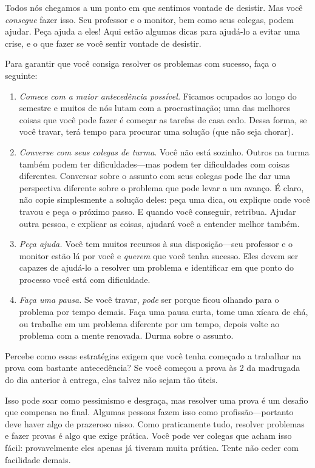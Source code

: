 \documentclass[../../../include/open-logic-section]{subfiles}
\begin{document}


Todos nós chegamos a um ponto em que sentimos vontade de desistir. Mas
você \emph{consegue} fazer isso. Seu professor e o monitor, bem como
seus colegas, podem ajudar. Peça ajuda a eles!{}  Aqui estão algumas
dicas para ajudá-lo a evitar uma crise, e o que fazer se você sentir
vontade de desistir.

Para garantir que você consiga resolver os problemas com sucesso, faça
o seguinte:
\begin{enumerate}
\item \emph{Comece com a maior antecedência possível.} Ficamos
  ocupados ao longo do semestre e muitos de nós lutam com a
  procrastinação; uma das melhores coisas que você pode fazer é começar
  as tarefas de casa cedo. Dessa forma, se você travar, terá tempo
  para procurar uma solução (que não seja chorar).
\item \emph{Converse com seus colegas de turma}.  Você não está
  sozinho. Outros na turma também podem ter dificuldades---mas podem
  ter dificuldades com coisas diferentes. Conversar sobre o assunto com
  seus colegas pode lhe dar uma perspectiva diferente sobre o problema
  que pode levar a um avanço.  É claro, não copie simplesmente a solução
  deles: peça uma dica, ou explique onde você travou e peça o próximo
  passo. E quando você conseguir, retribua. Ajudar outra pessoa, e
  explicar as coisas, ajudará você a entender melhor também.
\item \emph{Peça ajuda.} Você tem muitos recursos à sua
  disposição---seu professor e o monitor estão lá por você e
  \emph{querem} que você tenha sucesso. Eles devem ser capazes de
  ajudá-lo a resolver um problema e identificar em que ponto do processo
  você está com dificuldade.
\item \emph{Faça uma pausa.} Se você travar, \emph{pode} ser porque
  ficou olhando para o problema por tempo demais. Faça uma pausa curta,
  tome uma xícara de chá, ou trabalhe em um problema diferente por um
  tempo, depois volte ao problema com a mente renovada. Durma sobre o
  assunto.
\end{enumerate}

Percebe como essas estratégias exigem que você tenha começado a
trabalhar na prova com bastante antecedência? Se você começou a prova
às 2 da madrugada do dia anterior à entrega, elas talvez não sejam tão
úteis.

Isso pode soar como pessimismo e desgraça, mas resolver uma prova é um
desafio que compensa no final. Algumas pessoas fazem isso como
profissão---portanto deve haver algo de prazeroso nisso. Como
praticamente tudo, resolver problemas e fazer provas é algo que exige
prática.  Você pode ver colegas que acham isso fácil: provavelmente
eles apenas já tiveram muita prática.  Tente não ceder com facilidade
demais.
\end{document}
